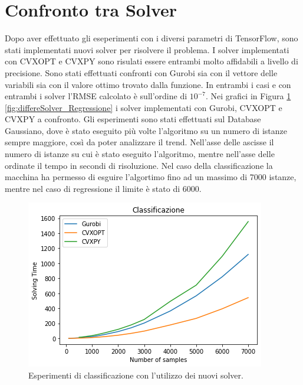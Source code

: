 \documentclass[a4paper,12pt]{report}
\begin{document}
\section{Confronto tra Solver}
Dopo aver effettuato gli eseperimenti con i diversi parametri di TensorFlow, sono stati implementati nuovi solver per risolvere il problema. I solver implementati con CVXOPT e CVXPY sono risulati essere entrambi molto affidabili a livello di precisione. Sono stati effettuati confronti con Gurobi sia con il vettore delle variabili sia con il valore ottimo trovato dalla funzione. In entrambi i casi e con entrambi i solver l'RMSE calcolato è sull'ordine di $10^{-7}$. Nei grafici in Figura \ref{fig:differeSolver_Classification} \ref{fig:differeSolver_Regressione} i solver implementati con Gurobi, CVXOPT e CVXPY a confronto. Gli esperimenti sono stati effettuati sul Database Gaussiano, dove è stato eseguito più volte l'algoritmo su un numero di istanze sempre maggiore, così da poter analizzare il trend. Nell'asse delle ascisse il numero di istanze su cui è stato eseguito l'algoritmo, mentre nell'asse delle ordinate il tempo in secondi di risoluzione. Nel caso della classificazione la macchina ha permesso di esguire l'algortimo fino ad un massimo di 7000 istanze, mentre nel caso di regressione il limite è stato di 6000.

\begin{figure}[H]
    \centering
    \includegraphics[scale=0.8]{images/Grafici/DifferentSolver_Classification.png}
    \caption{Esperimenti di classificazione con l'utilizzo dei nuovi solver.}
    \label{fig:differeSolver_Classification}
\end{figure}
\end{document}
